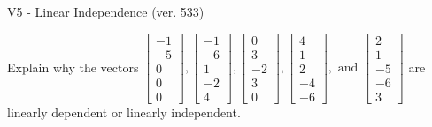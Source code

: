 \begin{exercise}
  \begin{exerciseTitle}V5 - Linear Independence (ver. 533)\end{exerciseTitle}
  \begin{exerciseStatement}
    Explain why the vectors \(\left[\begin{array}{r}
-1 \\
-5 \\
0 \\
0 \\
0
\end{array}\right] , \left[\begin{array}{r}
-1 \\
-6 \\
1 \\
-2 \\
4
\end{array}\right] , \left[\begin{array}{r}
0 \\
3 \\
-2 \\
3 \\
0
\end{array}\right] , \left[\begin{array}{r}
4 \\
1 \\
2 \\
-4 \\
-6
\end{array}\right] , \text{ and } \left[\begin{array}{r}
2 \\
1 \\
-5 \\
-6 \\
3
\end{array}\right]\) are linearly dependent or linearly independent.	



\end{exerciseStatement}
\end{exercise}
